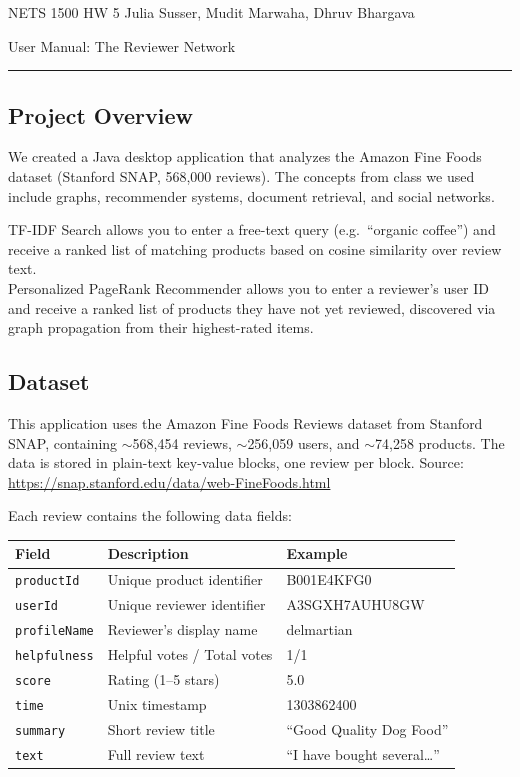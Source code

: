 \documentclass{article}
\newcommand{\HomeworkNo}{5}
\newcommand{\MyName}{Julia Susser, Mudit Marwaha, Dhruv Bhargava}
\newcommand{\PrintFirstHeader}{
\noindent NETS 1500 HW \HomeworkNo{} \hfill {\Large{\MyName}}

\vspace{3pt}
{\LARGE User Manual: The Reviewer Network}

\vspace{3pt}
\rule{\textwidth}{0.4pt}
\vspace{-30pt}
}
\begin{document}
\thispagestyle{firstpage}
\PrintFirstHeader{}
\allowdisplaybreaks

\subsection*{Project Overview}

We created a Java desktop application that analyzes the Amazon Fine Foods dataset (Stanford SNAP, 568,000 reviews). The concepts from class we used include graphs, recommender systems, document retrieval, and social networks.

TF-IDF Search allows you to enter a free-text query (e.g.\ ``organic coffee'') and receive a ranked list of matching products based on cosine similarity over review text.\\
Personalized PageRank Recommender allows you to enter a reviewer's user ID and receive a ranked list of products they have not yet reviewed, discovered via graph propagation from their highest-rated items.

\subsection*{Dataset}

This application uses the Amazon Fine Foods Reviews dataset from Stanford SNAP, containing $\sim$568,454 reviews, $\sim$256,059 users, and $\sim$74,258 products. The data is stored in plain-text key-value blocks, one review per block.
Source: \url{https://snap.stanford.edu/data/web-FineFoods.html}

Each review contains the following data fields:

\begin{center}
\begin{tabular}{lll}
\hline
Field & Description & Example \\
\hline
\texttt{productId}   & Unique product identifier        & B001E4KFG0 \\
\texttt{userId}      & Unique reviewer identifier       & A3SGXH7AUHU8GW \\
\texttt{profileName} & Reviewer's display name          & delmartian \\
\texttt{helpfulness} & Helpful votes / Total votes      & 1/1 \\
\texttt{score}       & Rating (1--5 stars)              & 5.0 \\
\texttt{time}        & Unix timestamp                   & 1303862400 \\
\texttt{summary}     & Short review title               & ``Good Quality Dog Food'' \\
\texttt{text}        & Full review text                 & ``I have bought several\ldots'' \\
\hline
\end{tabular}
\end{center}
\end{document}
